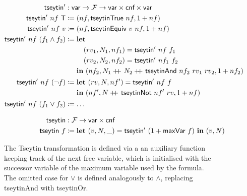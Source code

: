 \begin{figure}
\begin{align*}
  \textsf{tseytin}' &: \textsf{var} \rightarrow \mathcal{F} \rightarrow \textsf{var} \times \textsf{cnf} \times \textsf{var} \\
  \textsf{tseytin}'~nf~\mathsf{T} &\coloneqq (nf, \textsf{tseytinTrue}~nf, 1 +{nf}) \\
  \textsf{tseytin}'~nf~v &\coloneqq (nf, \textsf{tseytinEquiv}~v~nf, 1 +{nf}) \\
  \textsf{tseytin}'~nf~(f_1 \land f_2) &\coloneqq \begin{aligned}[t] 
    &\textbf{let}~ \\
    & \quad (rv_1, N_1, nf_1) = \textsf{tseytin}'~nf~f_1 \\
    & \quad (rv_2, N_2, nf_2) = \textsf{tseytin}'~nf_1~f_2 \\
    & \textbf{in}~ (nf_2, N_1 +\kern-1.3ex+\kern0.8ex N_2 +\kern-1.3ex+\kern0.8ex \textsf{tseytinAnd}~nf_2~rv_1~rv_2, 1 +{nf_2})
  \end{aligned}\\
    \textsf{tseytin}'~nf~(\lnot f) &\coloneqq \begin{aligned}[t]
      &\textbf{let}~ (rv, N, nf') = \textsf{tseytin}'~nf~f \\
      &\textbf{in}~ (nf', N +\kern-1.3ex+\kern0.8ex \textsf{tseytinNot}~nf'~rv, 1 +{nf})
    \end{aligned} \\
  \textsf{tseytin}'~nf~(f_1 \lor f_2) &\coloneqq \ldots \\[0.8em]
  \textsf{tseytin} & : \mathcal{F} \rightarrow \textsf{var} \times \textsf{cnf} \\
  \textsf{tseytin}~f &\coloneqq \textbf{let}~ (v, N, \_) = \textsf{tseytin}'~(1 +{\textsf{maxVar}~f})~\textbf{in}~ (v, N) 
\end{align*}
\caption{The Tseytin transformation is defined via a an auxiliary function keeping track of the next free variable, which is initialised with the successor variable of the maximum variable used by the formula. The omitted case for $\lor$ is defined analogously to $\land$, replacing \textsf{tseytinAnd} with \textsf{tseytinOr}.}\label{lst:tseytin}
\end{figure}

